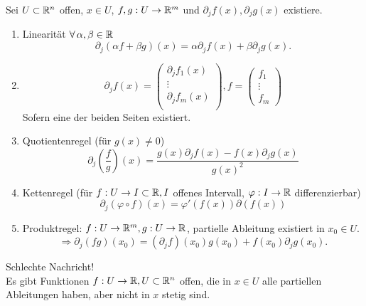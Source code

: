 \documentclass[../ana2.tex]{subfiles}
\begin{document}
\begin{lem}
    Sei \( U \subset \mathbb{R}^n \) offen, \( x\in U \), 
    \( f,g:U\rightarrow \mathbb{R}^m \) und 
    \( \partial_j f(x), \partial_j g(x) \) existiere.
    \begin{enumerate}
        \item Linearität \( \forall \alpha, \beta \in \R \)
        \[ \partial_j (\alpha f + \beta g)(x) 
        = \alpha \partial_j f(x) + \beta \partial_j g(x). \]
        \item \[ \partial_j f(x) = \left(\begin{array}{c}
            \partial_j f_1(x) \\
            \vdots \\
            \partial_j f_m(x) \\
        \end{array}\right), 
        f = \left( \begin{array}{c}
            f_1\\
            \vdots \\
            f_m           
        \end{array} \right) \]
        Sofern eine der beiden Seiten existiert.
        \item Quotientenregel (für \( g(x) \neq 0 \))
        \[ \partial_j \left(\frac{f}{g}\right)(x) 
        = \frac{g(x) \partial_j f(x) - f(x) \partial_j g(x)}{g(x)^2} \]
        \item Kettenregel (für \( f:U\rightarrow I \subset \mathbb{R}, 
        I \) offenes Intervall, 
        \( \varphi:I\rightarrow \mathbb{R} \) differenzierbar)
        \[ \partial_j (\varphi \circ f)(x) 
        = \varphi'(f(x)) \partial(f(x)) \]
        \item Produktregel: \( f:U\rightarrow \mathbb{R}^m, 
        g:U\rightarrow \mathbb{R} \), partielle Ableitung 
        existiert in \( x_0 \in U \).
        \[ \Rightarrow \partial_j(fg)(x_0) 
        = (\partial_j f)(x_0) g(x_0) + f(x_0) \partial_j g(x_0). \]
    \end{enumerate}
\end{lem}
Schlechte Nachricht!\\
Es gibt Funktionen \( f:U\rightarrow \mathbb{R}, U \subset \mathbb{R}^n \) offen, 
die in \( x\in U \) alle partiellen Ableitungen haben, 
aber nicht in \( x \) stetig sind.
\end{document}
